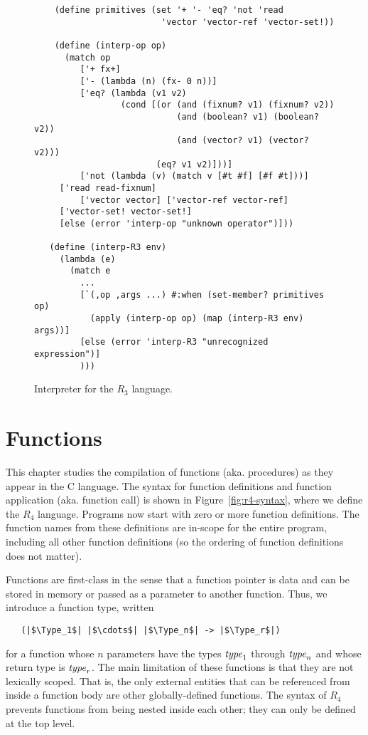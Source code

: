 \documentclass[11pt]{book}
\begin{document}
\begin{figure}[tbp]
\begin{lstlisting}
    (define primitives (set '+ '- 'eq? 'not 'read 
                         'vector 'vector-ref 'vector-set!))

    (define (interp-op op)
      (match op
         ['+ fx+]
         ['- (lambda (n) (fx- 0 n))]
         ['eq? (lambda (v1 v2)
                 (cond [(or (and (fixnum? v1) (fixnum? v2))
                            (and (boolean? v1) (boolean? v2))
                            (and (vector? v1) (vector? v2)))
                        (eq? v1 v2)]))]
         ['not (lambda (v) (match v [#t #f] [#f #t]))]
	 ['read read-fixnum]
         ['vector vector] ['vector-ref vector-ref]
	 ['vector-set! vector-set!]
	 [else (error 'interp-op "unknown operator")]))

   (define (interp-R3 env)
     (lambda (e)
       (match e
         ...
         [`(,op ,args ...) #:when (set-member? primitives op)
           (apply (interp-op op) (map (interp-R3 env) args))]
         [else (error 'interp-R3 "unrecognized expression")]
         )))
\end{lstlisting}
\caption{Interpreter for the $R_3$ language.}
\label{fig:interp-R3}
\end{figure}


\chapter{Functions}
\label{ch:functions}

This chapter studies the compilation of functions (aka. procedures) as
they appear in the C language. The syntax for function definitions and
function application (aka. function call) is shown in
Figure~\ref{fig:r4-syntax}, where we define the $R_4$ language.
Programs now start with zero or more function definitions.  The
function names from these definitions are in-scope for the entire
program, including all other function definitions (so the ordering of
function definitions does not matter). 

Functions are first-class in the sense that a function pointer is data
and can be stored in memory or passed as a parameter to another
function.  Thus, we introduce a function type, written
\begin{lstlisting}
   (|$\Type_1$| |$\cdots$| |$\Type_n$| -> |$\Type_r$|)
\end{lstlisting}
for a function whose $n$ parameters have the types $\mathit{type}_1$ through
$\mathit{type}_n$ and whose return type is $\mathit{type}_r$. The main limitation of
these functions is that they are not lexically scoped. That is, the
only external entities that can be referenced from inside a function
body are other globally-defined functions. The syntax of $R_4$
prevents functions from being nested inside each other; they can only
be defined at the top level.
\end{document}
